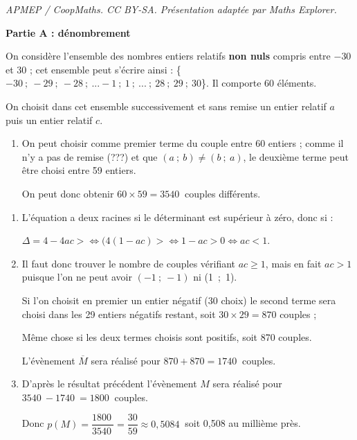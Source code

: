 \documentclass[10pt]{article}
\providecommand{\np}[2][]{{#2~#1}}
\begin{document}
\noindent\textit{APMEP / CoopMaths. CC BY-SA. Présentation adaptée par Maths Explorer.}\par\medskip
\medskip

\textbf{Partie A : dénombrement}

On considère l'ensemble des nombres entiers relatifs \textbf{non nuls} compris entre $- 30$ et $30$ ; cet ensemble peut s'écrire ainsi : \{$- 30~;~- 29~;~- 28~;~ ... - 1~;~1~;~ ... ~;~ 28~;~29~;~30$\}. Il comporte 60 éléments.

On choisit dans cet ensemble successivement et sans remise un entier relatif $a$ puis un entier relatif $c$.

\medskip

\begin{enumerate}
\item 
On peut choisir comme premier terme du couple entre 60 entiers ;  comme il n'y a pas de remise (???) et que $(a~;~b) \ne (b~;~a)$, le deuxième terme peut être choisi entre 59 entiers.

On peut donc obtenir $60 \times 59 = \np{3540}$ couples différents.
\end{enumerate}



\begin{enumerate}[resume]
\item 
L'équation a deux racines si  le déterminant est supérieur à zéro, donc si :

$\Delta = 4 - 4ac >  \iff (4(1 - ac) > \iff 1 - ac > 0 \iff ac < 1$.
\item 
Il faut donc trouver le nombre de couples vérifiant $ac \geqslant 1$, mais en fait $ac > 1$ puisque l'on ne peut avoir $(-1~;~-1)$ ni (1~;~1).

Si l'on choisit en premier un entier négatif (30 choix) le second terme sera choisi dans les 29 entiers négatifs restant, soit $30 \times 29 = 870$ couples ;

Même chose si les deux termes choisis sont positifs, soit 870 couples.

L'évènement $\overline{M}$ sera réalisé pour $870 + 870 = \np{1740}$ couples.
\item 
D'après le résultat précédent l'évènement $M$ sera réalisé pour $\np{3540} - \np{1740} = \np{1800}$ couples.

Donc $p(M) = \dfrac{\np{1800}}{\np{3540}} = \dfrac{30}{59} \approx \np{0,5084}$ soit 0,508 au millième près.
\end{enumerate}

\medskip
\end{document}
